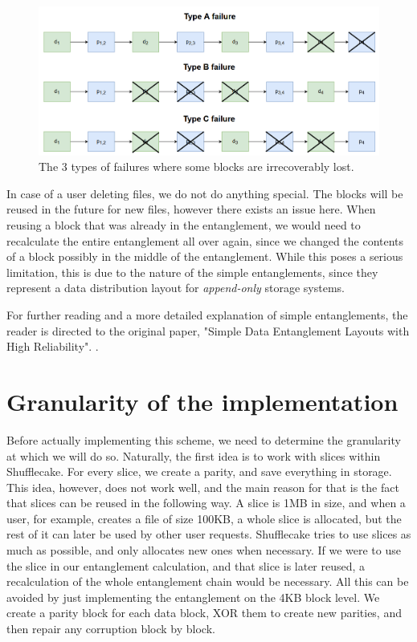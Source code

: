 \documentclass[a4paper,11pt,oneside]{report}
\begin{document}
\begin{figure}[!ht]
    \centering
    \includegraphics[scale=0.5]{figures/Irrecoverable_failures.PNG}
    \caption{The 3 types of failures where some blocks are irrecoverably lost.}
    \label{fig:irrecoverable_failures}
\end{figure}

In case of a user deleting files, we do not do anything special. The blocks will be reused in the future for new files, however there exists an issue here. When reusing a block that was already in the entanglement, we would need to recalculate the entire entanglement all over again, since we changed the contents of a block possibly in the middle of the entanglement. While this poses a serious limitation, this is due to the nature of the simple entanglements, since they represent a data distribution layout for \emph{append-only} storage systems. 

For further reading and a more detailed explanation of simple entanglements, the reader is directed to the original paper, "Simple Data Entanglement Layouts with High Reliability". \cite{estrada}.

\section{Granularity of the implementation}
Before actually implementing this scheme, we need to determine the granularity at which we will do so. Naturally, the first idea is to work with slices within Shufflecake. For every slice, we create a parity, and save everything in storage. This idea, however, does not work well, and the main reason for that is the fact that slices can be reused in the following way. A slice is 1MB in size, and when a user, for example, creates a file of size 100KB, a whole slice is allocated, but the rest of it can later be used by other user requests. Shufflecake tries to use slices as much as possible, and only allocates new ones when necessary. If we were to use the slice in our entanglement calculation, and that slice is later reused, a recalculation of the whole entanglement chain would be necessary. All this can be avoided by just implementing the entanglement on the 4KB block level. We create a parity block for each data block, XOR them to create new parities, and then repair any corruption block by block. 
\end{document}
